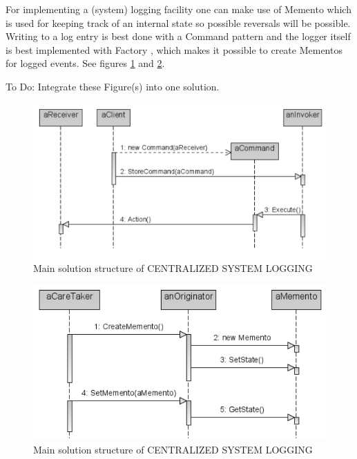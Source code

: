 For implementing a (system) logging facility one can make use of {\sc Memento} \cite{Gamma95} which is used for keeping track of an internal state so possible reversals will be possible. Writing to a log entry is best done with a {\sc Command} \cite{Gamma95} pattern and the logger itself is best implemented with {\sc Factory} \cite{Gamma95}, which makes it possible to create Mementos for logged events. See figures \ref{fig:systemLogging-1} and \ref{fig:systemLogging-2}.

To Do: Integrate these Figure(s) into one solution.

\begin{figure}[h]
\centering
\includegraphics{patterns/systemLoggingDiagram-01.pdf}
\caption{Main solution structure of CENTRALIZED SYSTEM LOGGING \cite{Gamma95}}
\label{fig:systemLogging-1}
\end{figure}

\begin{figure}[h]
\centering
\includegraphics{patterns/systemLoggingDiagram-02.pdf}
\caption{Main solution structure of CENTRALIZED SYSTEM LOGGING \cite{Gamma95}}
\label{fig:systemLogging-2}
\end{figure}

